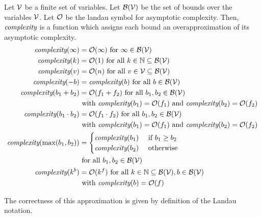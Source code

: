 \begin{definition}
  Let $\mathcal{V}$ be a finite set of variables.
  Let $\mathcal{B}(\mathcal{V})$ be the set of bounds over the variables $\mathcal{V}$.
  Let $\mathcal{O}$ be the landau symbol for asymptotic complexity.
  Then, $\emph{complexity}$ is a function which assigns each bound an overapproximation of its asymptotic complexity.
  \begin{align*}
    \emph{complexity}(\infty) &= \mathcal{O}(\infty) \text{ for } \infty \in \mathcal{B}(\mathcal{V}) \\
    \emph{complexity}(k) &= \mathcal{O}(1) \text{ for all } k \in \mathbb{N} \subseteq \mathcal{B}(\mathcal{V}) \\
    \emph{complexity}(v) &= \mathcal{O}(n) \text{ for all } v \in \mathcal{V} \subseteq \mathcal{B}(\mathcal{V}) \\
    \emph{complexity}(-b) &= \emph{complexity}(b) \text{ for all } b \in \mathcal{B}(\mathcal{V}) \\
    \emph{complexity}(b_1 + b_2) &= \mathcal{O}(f_1 + f_2) \text{ for all } b_1, b_2 \in \mathcal{B}(\mathcal{V}) \\
    & \text{ with } \emph{complexity}(b_1)=\mathcal{O}(f_1) \text{ and } \emph{complexity}(b_2)=\mathcal{O}(f_2) \\
    \emph{complexity}(b_1 \cdot b_2) &= \mathcal{O}(f_1 \cdot f_2) \text{ for all } b_1, b_2 \in \mathcal{B}(\mathcal{V}) \\
    & \text{ with } \emph{complexity}(b_1)=\mathcal{O}(f_1) \text{ and } \emph{complexity}(b_2)=\mathcal{O}(f_2) \\
    \emph{complexity}(\max(b_1, b_2)) &=
    \begin{cases}
      \emph{complexity}(b_1) & \text{ if } b_1 \geq b_2 \\
      \emph{complexity}(b_2) & \text{ otherwise }
    \end{cases} \\
    & \text{ for all } b_1, b_2 \in \mathcal{B}(\mathcal{V}) \\
    \emph{complexity}(k^b) &= \mathcal{O}(k^f) \text{ for all } k \in \mathbb{N} \subseteq \mathcal{B}(\mathcal{V}), b \in \mathcal{B}(\mathcal{V}) \\
    & \text{ with } \emph{complexity}(b)=\mathcal{O}(f)
  \end{align*}
\end{definition}

The correctness of this approximation is given by definition of the Landau notation.

